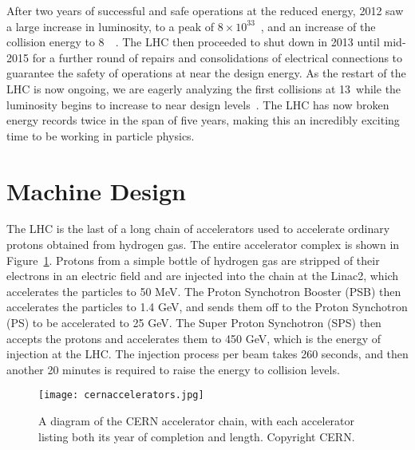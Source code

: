 After two years of successful and safe operations at the reduced energy, 2012 saw a large increase in luminosity, to a peak of $8\times10^{33}$~\lumirate, and an increase of the collision energy to 8~\TeV~\cite{LHCWeb}. The LHC then proceeded to shut down in 2013 until mid-2015 for a further round of repairs and consolidations of electrical connections to guarantee the safety of operations at near the design energy. As the restart of the LHC is now ongoing, we are eagerly analyzing the first collisions at 13~\TeV while the luminosity begins to increase to near design levels~\cite{LHC15}. The LHC has now broken energy records twice in the span of five years, making this an incredibly exciting time to be working in particle physics.


\section{Machine Design}

The LHC is the last of a long chain of accelerators used to accelerate ordinary protons obtained from hydrogen gas\cite{cern-accelerators,LHC2008-2013}. The entire accelerator complex is shown in Figure~\ref{fig:lhc:cern-accelerators}. Protons from a simple bottle of hydrogen gas are stripped of their electrons in an electric field and are injected into the chain at the Linac2, which accelerates the particles to 50 MeV. The Proton Synchotron Booster (PSB) then accelerates the particles to 1.4 GeV, and sends them off to the Proton Synchotron (PS) to be accelerated to 25 GeV. The Super Proton Synchotron (SPS) then accepts the protons and accelerates them to 450 GeV, which is the energy of injection at the LHC. The injection process per beam takes 260 seconds, and then another 20 minutes is required to raise the energy to collision levels.


\begin{figure}
\centering
\texttt{[image: cernaccelerators.jpg]}
\label{fig:lhc:cern-accelerators}
\caption{A diagram of the CERN accelerator chain, with each accelerator listing both its year of completion and length. Copyright CERN.}
\end{figure}


